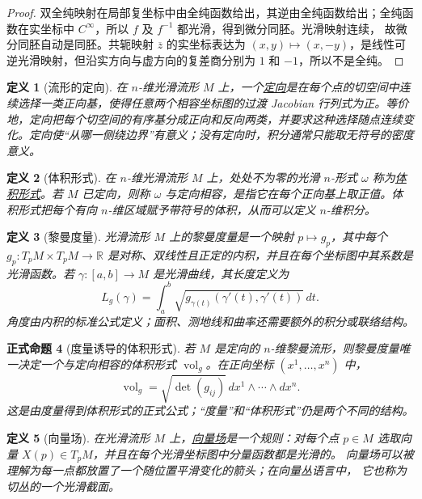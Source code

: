 \documentclass[UTF8,fontset=none,a4paper,11pt]{ctexart}
\theoremstyle{foundation-definition}
\newtheorem{definition}{定义}[section]
\theoremstyle{foundation-theorem}
\theoremstyle{foundation-proposition}
\newtheorem{proposition}[definition]{正式命题}
\theoremstyle{foundation-example}
\theoremstyle{foundation-remark}
\theoremstyle{foundation-theorem}
\newcommand{\term}[2]{\hyperref[#1]{#2}}
\begin{document}
\begin{proof}
双全纯映射在局部复坐标中由全纯函数给出，其逆由全纯函数给出；全纯函数在实坐标中
\(C^\infty\)，所以 \(f\) 及 \(f^{-1}\) 都光滑，得到微分同胚。光滑映射连续，
故微分同胚自动是同胚。共轭映射 \(\overline z\) 的实坐标表达为
\((x,y)\mapsto(x,-y)\)，是线性可逆光滑映射，但沿实方向与虚方向的复差商分别为
\(1\) 和 \(-1\)，所以不是全纯。\end{proof}

\begin{definition}[流形的定向]\label{def:manifold-orientation}
在 \(n\)-维光滑流形 \(M\) 上，一个\term{def:manifold-orientation}{定向}是在每个点的切空间中连续选择一类正向基，使得任意两个相容坐标图的过渡 Jacobian 行列式为正。等价地，定向把每个切空间的有序基分成正向和反向两类，并要求这种选择随点连续变化。定向使“从哪一侧绕边界”有意义；没有定向时，积分通常只能取无符号的密度意义。
\end{definition}

\begin{definition}[体积形式]\label{def:volume-form}
在 \(n\)-维光滑流形 \(M\) 上，处处不为零的光滑 \(n\)-形式 \(\omega\) 称为\term{def:volume-form}{体积形式}。若 \(M\) 已定向，则称 \(\omega\) 与定向相容，是指它在每个正向基上取正值。体积形式把每个有向 \(n\)-维区域赋予带符号的体积，从而可以定义 \(n\)-维积分。
\end{definition}

\begin{definition}[黎曼度量]\label{def:metric}
光滑流形 \(M\) 上的黎曼度量是一个映射 \(p\mapsto g_p\)，其中每个 \(g_p:T_pM\times T_pM\to\mathbb R\) 是对称、双线性且正定的内积，并且在每个坐标图中其系数是光滑函数。若 \(\gamma:[a,b]\to M\) 是光滑曲线，其长度定义为
\[
L_g(\gamma)=\int_a^b\sqrt{g_{\gamma(t)}(\gamma'(t),\gamma'(t))}\,dt.
\]
角度由内积的标准公式定义；面积、测地线和曲率还需要额外的积分或联络结构。
\end{definition}

\begin{proposition}[度量诱导的体积形式]\label{prop:metric-volume-form}
若 \(M\) 是定向的 \(n\)-维黎曼流形，则黎曼度量唯一决定一个与定向相容的体积形式 \(\operatorname{vol}_g\)。在正向坐标 \((x^1,\ldots,x^n)\) 中，
\[
\operatorname{vol}_g=\sqrt{\det(g_{ij})}\,dx^1\wedge\cdots\wedge dx^n.
\]
这是由度量得到体积形式的正式公式；“度量”和“体积形式”仍是两个不同的结构。
\end{proposition}

\begin{definition}[向量场]\label{def:vector-field}
在光滑流形 \(M\) 上，\term{def:vector-field}{向量场}是一个规则：对每个点
\(p\in M\) 选取向量 \(X(p)\in T_pM\)，并且在每个光滑坐标图中分量函数都是光滑的。
向量场可以被理解为每一点都放置了一个随位置平滑变化的箭头；在向量丛语言中，
它也称为切丛的一个光滑截面。
\end{definition}
\end{document}
